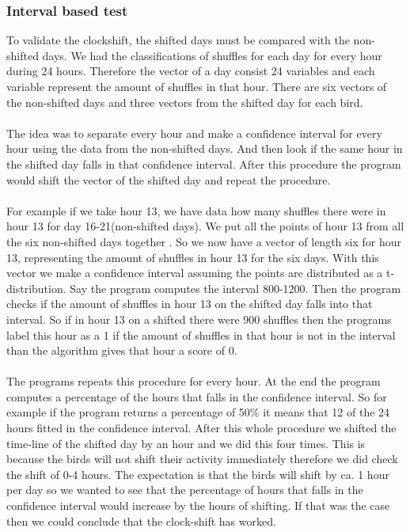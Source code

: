 \documentclass[a4paper]{article}
\begin{document}
\subsubsection*{Interval based test}
To validate the clockshift, the shifted days must be compared with the non-shifted days. We had the classifications of shuffles for each day for every hour during 24 hours. Therefore the vector of a day consist 24 variables and each variable represent the amount of shuffles in that hour. There are six vectors of the non-shifted days and three vectors from the shifted day for each bird.\\\\
The idea was to separate every hour and make a confidence interval for every hour using the data from the non-shifted days. And then look if the same hour in the shifted day falls in that confidence interval. After this procedure the program would shift the vector of the shifted day and repeat the procedure.\\\\ 
For example if we take hour 13, we have data how many shuffles there were in hour 13 for day 16-21(non-shifted days). We put all the points of hour 13 from all the six non-shifted days together . So we now have a vector of length six for hour 13, representing the amount of shuffles in hour 13 for the six days. With this vector we make a confidence interval assuming the points are distributed as a t-distribution. Say the program computes the interval 800-1200. Then the program checks if  the amount of shuffles in hour 13 on the shifted day falls into that interval. So if in hour 13 on a shifted there were 900 shuffles then the programs label this hour as a 1 if the amount of shuffles in that hour is not in the interval than the algorithm gives that hour a score of 0. \\\\
The programs repeats this procedure for every hour. At the end the program computes a percentage of the hours that falls in the confidence interval. So for example if the program returns a percentage of 50\% it means that 12 of the 24 hours fitted in the confidence interval. After this whole procedure we shifted the time-line of the shifted day by an hour and we did this four times. This is because the birds will not shift their activity immediately therefore we did check the shift of 0-4 hours. The expectation is that the birds will shift by ca. 1 hour per day so we wanted to see that the percentage of hours that falls in the confidence interval would increase by the hours of shifting. If that was the case then we could conclude that the clock-shift has worked. 
\end{document}
